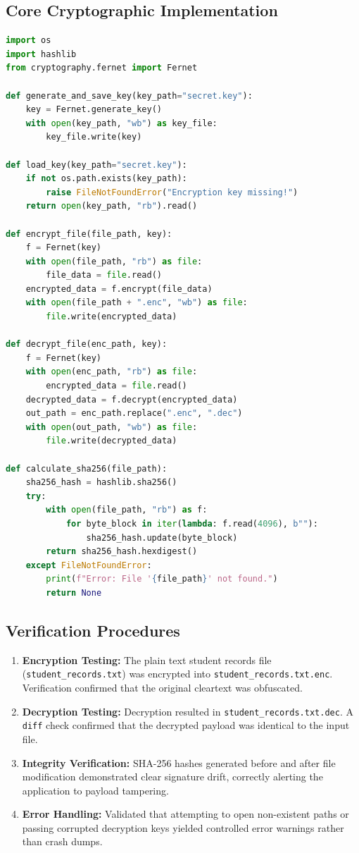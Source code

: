 \documentclass[12pt,a4paper]{article}
\begin{document}
\subsection{Core Cryptographic Implementation}
\begin{lstlisting}[language=Python, caption=Python Security Application Excerpt]
import os
import hashlib
from cryptography.fernet import Fernet

def generate_and_save_key(key_path="secret.key"):
    key = Fernet.generate_key()
    with open(key_path, "wb") as key_file:
        key_file.write(key)

def load_key(key_path="secret.key"):
    if not os.path.exists(key_path):
        raise FileNotFoundError("Encryption key missing!")
    return open(key_path, "rb").read()

def encrypt_file(file_path, key):
    f = Fernet(key)
    with open(file_path, "rb") as file:
        file_data = file.read()
    encrypted_data = f.encrypt(file_data)
    with open(file_path + ".enc", "wb") as file:
        file.write(encrypted_data)

def decrypt_file(enc_path, key):
    f = Fernet(key)
    with open(enc_path, "rb") as file:
        encrypted_data = file.read()
    decrypted_data = f.decrypt(encrypted_data)
    out_path = enc_path.replace(".enc", ".dec")
    with open(out_path, "wb") as file:
        file.write(decrypted_data)

def calculate_sha256(file_path):
    sha256_hash = hashlib.sha256()
    try:
        with open(file_path, "rb") as f:
            for byte_block in iter(lambda: f.read(4096), b""):
                sha256_hash.update(byte_block)
        return sha256_hash.hexdigest()
    except FileNotFoundError:
        print(f"Error: File '{file_path}' not found.")
        return None
\end{lstlisting}

\subsection{Verification Procedures}
\begin{enumerate}
    \item \textbf{Encryption Testing:} The plain text student records file (\texttt{student\_records.txt}) was encrypted into \texttt{student\_records.txt.enc}. Verification confirmed that the original cleartext was obfuscated.
    \item \textbf{Decryption Testing:} Decryption resulted in \texttt{student\_records.txt.dec}. A \texttt{diff} check confirmed that the decrypted payload was identical to the input file.
    \item \textbf{Integrity Verification:} SHA-256 hashes generated before and after file modification demonstrated clear signature drift, correctly alerting the application to payload tampering.
    \item \textbf{Error Handling:} Validated that attempting to open non-existent paths or passing corrupted decryption keys yielded controlled error warnings rather than crash dumps.
\end{enumerate}
\end{document}
